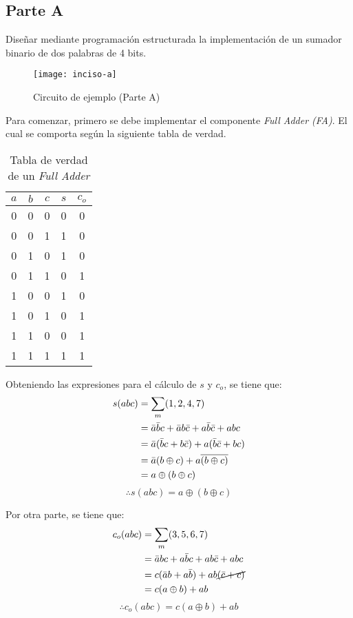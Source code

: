 \documentclass[../procedimientos.tex]{subfiles}
\begin{document}
\clearpage
\subsection{Parte A}
\begin{em}
  Diseñar mediante programación estructurada la implementación de un sumador
  binario de dos palabras de 4 bits.
\end{em}
\begin{figure}[H]
  \centering
  \texttt{[image: inciso-a]}
  \caption{Circuito de ejemplo (Parte A)}
  \label{fig:inciso_a}
\end{figure}

Para comenzar, primero se debe implementar el componente \textit{Full Adder 
(FA)}. El cual se comporta según la siguiente tabla de verdad.
\begin{table}[h]
  \centering
  \begin{tabular}{ccc|cc}
    $a$ & $b$ & $c$ & $s$ & $c_o$\\
    \hline
    0 & 0 & 0 & 0 & 0\\
    0 & 0 & 1 & 1 & 0\\
    0 & 1 & 0 & 1 & 0\\
    0 & 1 & 1 & 0 & 1\\
    1 & 0 & 0 & 1 & 0\\
    1 & 0 & 1 & 0 & 1\\
    1 & 1 & 0 & 0 & 1\\
    1 & 1 & 1 & 1 & 1\\
  \end{tabular}
  \caption{Tabla de verdad de un \textit{Full Adder}}
\end{table}

Obteniendo las expresiones para el cálculo de $s$ y $c_o$, se tiene que:
\begin{align*}
  s(abc)  &= \sum_m (1,2,4,7)\\
            &= \bar{a}\bar{b}c + \bar{a}b\bar{c} + a\bar{b}\bar{c} + abc\\
            &= \bar{a}(\bar{b}c + b\bar{c}) + a(\bar{b}\bar{c} + bc)\\
            &= \bar{a}(b \oplus c) + a \overline{(b \oplus c)}\\
            &= a \oplus (b \oplus c)
\end{align*}
\begin{equation*}
  \boxed{
    \therefore s(abc) = a \oplus (b \oplus c)
  }
\end{equation*}

Por otra parte, se tiene que:
\begin{align*}
  c_o(abc)  &= \sum_m (3,5,6,7)\\
            &= \bar{a}bc + a\bar{b}c + ab\bar{c} + abc\\
            &= c(\bar{a}b + a\bar{b}) + ab\cancel{(\bar{c}+c)}\\
            &= c(a \oplus b) + ab
\end{align*}
\begin{equation*}
  \boxed{
    \therefore c_o(abc) = c(a \oplus b) + ab
  }
\end{equation*}
\end{document}
